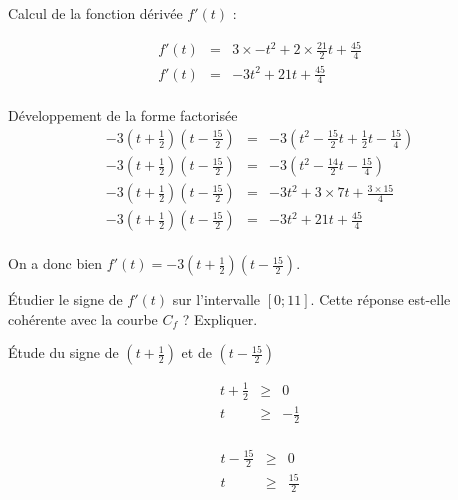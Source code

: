 \begin{questions}
		\begin{solution}
			Calcul de la fonction dérivée $f'(t)$ :
			
			\begin{eqnarray*}
				f'(t) &=& 3 \times -t^2 + 2 \times \frac{21}{2} t + \frac{45}{4} \\
				f'(t) &=& -3t^2 + 21 t + \frac{45}{4} \\
			\end{eqnarray*}
		
			Développement de la forme factorisée
			\begin{eqnarray*}
				-3 \left(t + \frac{1}{2} \right) \left(t - \frac{15}{2} \right) &=& -3 \left( t^2 - \frac{15}{2}t + \frac{1}{2}t - \frac{15}{4}\right) \\
				-3 \left(t + \frac{1}{2} \right) \left(t - \frac{15}{2} \right) &=& -3 \left( t^2 - \frac{14}{2}t - \frac{15}{4}\right) \\
				-3 \left(t + \frac{1}{2} \right) \left(t - \frac{15}{2} \right) &=&  -3t^2 + 3 \times 7t + \frac{3 \times 15}{4}  \\
				-3 \left(t + \frac{1}{2} \right) \left(t - \frac{15}{2} \right) &=& -3t^2 + 21t + \frac{45}{4} \\
			\end{eqnarray*}
			
			On a donc bien $f'(t) = -3 \left(t + \frac{1}{2} \right) \left(t - \frac{15}{2} \right)$.
		\end{solution}
		
	\question[3] \'Etudier le signe de $f'(t)$ sur l'intervalle $\left[0; 11\right]$. Cette réponse est-elle cohérente avec la courbe $C_f$ ? Expliquer.
	
	\begin{solution}
		\'Etude du signe de $(t + \frac{1}{2})$ et de $(t - \frac{15}{2})$
		
		\begin{multicols}{2}
			\begin{eqnarray*}
				t + \frac{1}{2} & \ge & 0 \\
				t & \ge & - \frac{1}{2} \\
			\end{eqnarray*}
		
			\begin{eqnarray*}
				t - \frac{15}{2} & \ge & 0 \\
				t & \ge & \frac{15}{2} \\
			\end{eqnarray*}
		\end{multicols}
	

\end{solution}
\end{questions}
